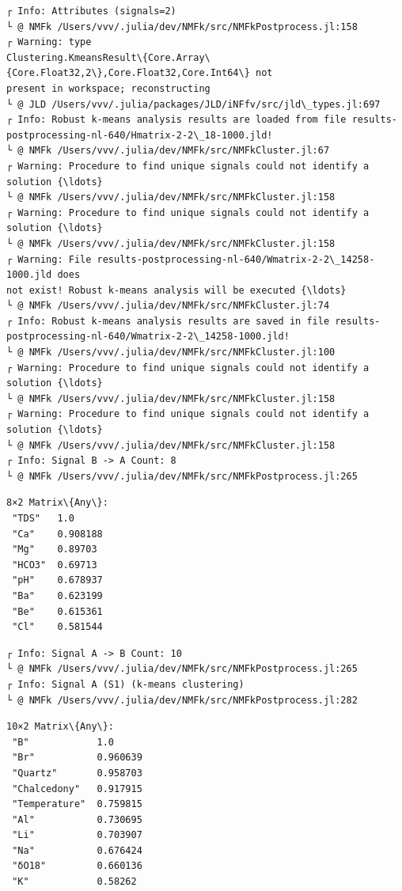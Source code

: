 \documentclass[11pt]{article}
\begin{document}
    \begin{Verbatim}[commandchars=\\\{\}]
┌ Info: Attributes (signals=2)
└ @ NMFk /Users/vvv/.julia/dev/NMFk/src/NMFkPostprocess.jl:158
┌ Warning: type
Clustering.KmeansResult\{Core.Array\{Core.Float32,2\},Core.Float32,Core.Int64\} not
present in workspace; reconstructing
└ @ JLD /Users/vvv/.julia/packages/JLD/iNFfv/src/jld\_types.jl:697
┌ Info: Robust k-means analysis results are loaded from file results-
postprocessing-nl-640/Hmatrix-2-2\_18-1000.jld!
└ @ NMFk /Users/vvv/.julia/dev/NMFk/src/NMFkCluster.jl:67
┌ Warning: Procedure to find unique signals could not identify a solution {\ldots}
└ @ NMFk /Users/vvv/.julia/dev/NMFk/src/NMFkCluster.jl:158
┌ Warning: Procedure to find unique signals could not identify a solution {\ldots}
└ @ NMFk /Users/vvv/.julia/dev/NMFk/src/NMFkCluster.jl:158
┌ Warning: File results-postprocessing-nl-640/Wmatrix-2-2\_14258-1000.jld does
not exist! Robust k-means analysis will be executed {\ldots}
└ @ NMFk /Users/vvv/.julia/dev/NMFk/src/NMFkCluster.jl:74
┌ Info: Robust k-means analysis results are saved in file results-
postprocessing-nl-640/Wmatrix-2-2\_14258-1000.jld!
└ @ NMFk /Users/vvv/.julia/dev/NMFk/src/NMFkCluster.jl:100
┌ Warning: Procedure to find unique signals could not identify a solution {\ldots}
└ @ NMFk /Users/vvv/.julia/dev/NMFk/src/NMFkCluster.jl:158
┌ Warning: Procedure to find unique signals could not identify a solution {\ldots}
└ @ NMFk /Users/vvv/.julia/dev/NMFk/src/NMFkCluster.jl:158
┌ Info: Signal B -> A Count: 8
└ @ NMFk /Users/vvv/.julia/dev/NMFk/src/NMFkPostprocess.jl:265
    \end{Verbatim}

    
    \begin{Verbatim}[commandchars=\\\{\}]
8×2 Matrix\{Any\}:
 "TDS"   1.0
 "Ca"    0.908188
 "Mg"    0.89703
 "HCO3"  0.69713
 "pH"    0.678937
 "Ba"    0.623199
 "Be"    0.615361
 "Cl"    0.581544
    \end{Verbatim}

    
    \begin{Verbatim}[commandchars=\\\{\}]
┌ Info: Signal A -> B Count: 10
└ @ NMFk /Users/vvv/.julia/dev/NMFk/src/NMFkPostprocess.jl:265
┌ Info: Signal A (S1) (k-means clustering)
└ @ NMFk /Users/vvv/.julia/dev/NMFk/src/NMFkPostprocess.jl:282
    \end{Verbatim}

    
    \begin{Verbatim}[commandchars=\\\{\}]
10×2 Matrix\{Any\}:
 "B"            1.0
 "Br"           0.960639
 "Quartz"       0.958703
 "Chalcedony"   0.917915
 "Temperature"  0.759815
 "Al"           0.730695
 "Li"           0.703907
 "Na"           0.676424
 "δO18"         0.660136
 "K"            0.58262
    \end{Verbatim}
\end{document}

